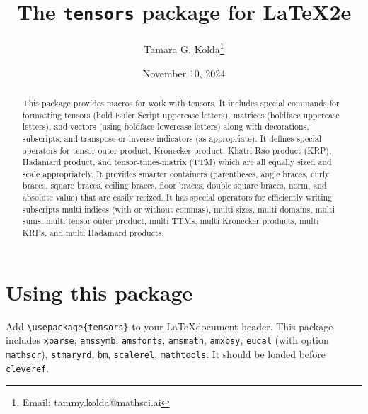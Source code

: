 \documentclass{article}
\title{The \texttt{tensors} package for \LaTeX2e}
\author{Tamara G. Kolda\footnote{Email: tammy.kolda@mathsci.ai}}
\date{November 10, 2024}
\begin{document}
\maketitle

\begin{abstract}
  This package provides macros for work with tensors.
  It includes special commands for formatting tensors (bold Euler Script uppercase letters),
  matrices (boldface uppercase letters), and vectors (using boldface lowercase letters) along with
  decorations, subscripts, and transpose or inverse indicators (as appropriate).
  It defines special operators for tensor outer product, Kronecker product, Khatri-Rao product (KRP),
  Hadamard product, and tensor-times-matrix (TTM) which are all equally sized and scale appropriately.
  It provides smarter containers (parentheses, angle braces, curly braces, square braces,
  ceiling braces, floor braces, double square braces, norm, and absolute value) that are
  easily resized.
  It has special operators for efficiently writing subscripts multi indices (with or without commas),
  multi sizes, multi domains, multi sums, multi tensor outer product, multi TTMs, multi Kronecker
  products, multi KRPs, and multi Hadamard products.
\end{abstract}

\section{Using this package}
\label{sec:using-this-package}

Add \lstinline|\usepackage{tensors}| to your \LaTeX\@ document header.
This package includes \texttt{xparse},
\texttt{amssymb}, \texttt{amsfonts}, \texttt{amsmath}, \texttt{amxbsy},
\texttt{eucal} (with option \texttt{mathscr}),
\texttt{stmaryrd},
\texttt{bm},
\texttt{scalerel},
\texttt{mathtools}.
It should be loaded before \lstinline{cleveref}.



\end{document}
